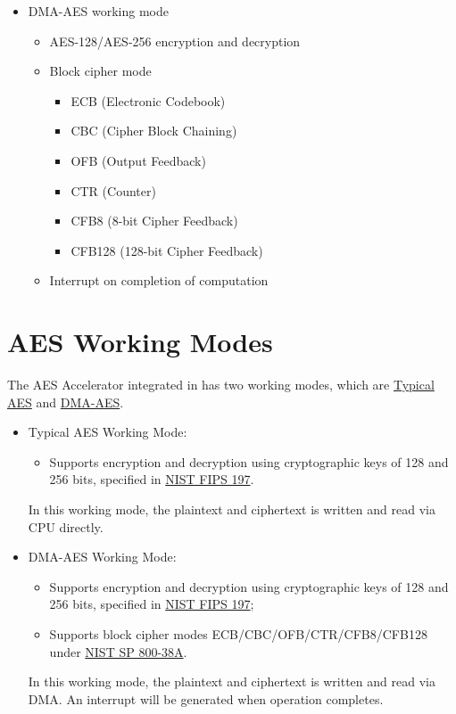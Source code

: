 \documentclass[main\_\_EN.tex]{subfiles}
\begin{document}
    \begin{itemize}
    \item DMA-AES working mode
        \begin{itemize}
            \item AES-128/AES-256 encryption and decryption
            \item Block cipher mode
                \begin{itemize}
                    \item ECB (Electronic Codebook)
                    \item CBC (Cipher Block Chaining)
                    \item OFB (Output Feedback)
                    \item CTR (Counter)
                    \item CFB8 (8-bit Cipher Feedback)
                    \item CFB128 (128-bit Cipher Feedback)
                \end{itemize}
            \item Interrupt on completion of computation
        \end{itemize}
    \end{itemize}


\section{AES Working Modes}

The AES Accelerator integrated in \chipname{} has two working modes, which are \hyperref[sec:aes-typical-modes]{Typical AES} and \hyperref[sec:aes-dma-aes]{DMA-AES}.

\begin{itemize}
    \item Typical AES Working Mode: \begin{itemize}
        \item Supports encryption and decryption using cryptographic keys of 128 and 256 bits, specified in \href{https://nvlpubs.nist.gov/nistpubs/FIPS/NIST.FIPS.197.pdf}{NIST FIPS 197}.
    \end{itemize}
    In this working mode, the plaintext and ciphertext is written and read via CPU directly.
    \item DMA-AES Working Mode:
    \begin{itemize}
        \item Supports encryption and decryption using cryptographic keys of 128 and 256 bits, specified in \href{https://nvlpubs.nist.gov/nistpubs/FIPS/NIST.FIPS.197.pdf}{NIST FIPS 197};
        \item Supports block cipher modes ECB/CBC/OFB/CTR/CFB8/CFB128 under \href{https://nvlpubs.nist.gov/nistpubs/Legacy/SP/nistspecialpublication800-38a.pdf}{NIST SP 800-38A}.
    \end{itemize}
    In this working mode, the plaintext and ciphertext is written and read via DMA. An interrupt will be generated when operation completes.
\end{itemize}
\end{document}
